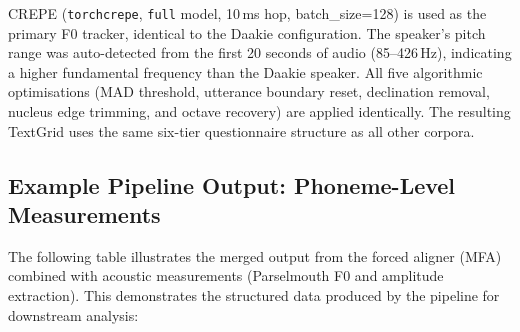 CREPE (\texttt{torchcrepe}, \texttt{full} model, 10\,ms hop, batch\_size=128)
is used as the primary F0 tracker, identical to the Daakie configuration. The
speaker's pitch range was auto-detected from the first 20 seconds of audio
(85--426\,Hz), indicating a higher fundamental frequency than the Daakie
speaker. All five algorithmic optimisations (MAD threshold, utterance boundary
reset, declination removal, nucleus edge trimming, and octave recovery) are
applied identically. The resulting TextGrid uses the same six-tier questionnaire
structure as all other corpora.

\subsection{Example Pipeline Output: Phoneme-Level Measurements}

The following table illustrates the merged output from the forced aligner (MFA) combined with acoustic measurements (Parselmouth F0 and amplitude extraction). This demonstrates the structured data produced by the pipeline for downstream analysis:

